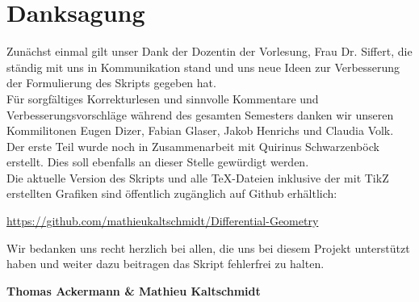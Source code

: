 \chapter*{Danksagung}
Zunächst einmal gilt unser Dank der Dozentin der Vorlesung, Frau Dr. Siffert, die ständig mit uns in Kommunikation stand und uns neue Ideen zur Verbesserung der Formulierung des Skripts gegeben hat. \\

Für sorgfältiges Korrekturlesen und sinnvolle Kommentare und Verbesserungsvorschläge während des gesamten Semesters danken wir unseren Kommilitonen Eugen Dizer, Fabian Glaser, Jakob Henrichs und Claudia Volk.\\

Der erste Teil wurde noch in Zusammenarbeit mit Quirinus Schwarzenböck erstellt. Dies soll ebenfalls an dieser Stelle gewürdigt werden. \\

Die aktuelle Version des Skripts und alle TeX-Dateien inklusive der mit TikZ erstellten Grafiken sind öffentlich zugänglich auf Github erhältlich:
\begin{center}
	\url{https://github.com/mathieukaltschmidt/Differential-Geometry}
\end{center} 

Wir bedanken uns recht herzlich bei allen, die uns bei diesem Projekt unterstützt haben und weiter dazu beitragen das Skript fehlerfrei zu halten.  \\

\begin{center}
\textbf{Thomas Ackermann \& Mathieu Kaltschmidt}	
\end{center}

\blankpage
